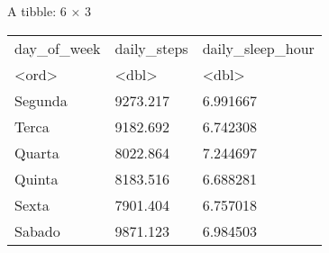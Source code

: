 A tibble: 6 × 3
\begin{tabular}{lll}
    day\_of\_week & daily\_steps & daily\_sleep\_hour \\
    <ord>         & <dbl>        & <dbl>              \\
    \hline
    Segunda       & 9273.217     & 6.991667           \\
    Terca         & 9182.692     & 6.742308           \\
    Quarta        & 8022.864     & 7.244697           \\
    Quinta        & 8183.516     & 6.688281           \\
    Sexta         & 7901.404     & 6.757018           \\
    Sabado        & 9871.123     & 6.984503           \\
\end{tabular}



